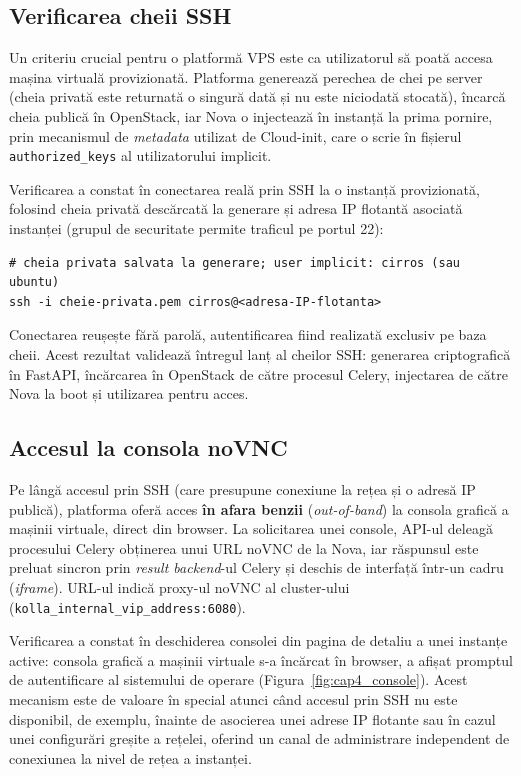 \subsection{Verificarea cheii SSH}
\label{subsec:cap4_ssh}

Un criteriu crucial pentru o platformă VPS este ca utilizatorul să poată accesa mașina virtuală provizionată. Platforma generează perechea de chei pe server (cheia privată este returnată o singură dată și nu este niciodată stocată), încarcă cheia publică în OpenStack, iar Nova o injectează în instanță la prima pornire, prin mecanismul de \textit{metadata} utilizat de Cloud-init, care o scrie în fișierul \texttt{authorized\_keys} al utilizatorului implicit.

Verificarea a constat în conectarea reală prin SSH la o instanță provizionată, folosind cheia privată descărcată la generare și adresa IP flotantă asociată instanței (grupul de securitate permite traficul pe portul 22):

\begin{lstlisting}[basicstyle=\ttfamily\footnotesize,breaklines=true,frame=single]
# cheia privata salvata la generare; user implicit: cirros (sau ubuntu)
ssh -i cheie-privata.pem cirros@<adresa-IP-flotanta>
\end{lstlisting}

\noindent Conectarea reușește fără parolă, autentificarea fiind realizată exclusiv pe baza cheii. Acest rezultat validează întregul lanț al cheilor SSH: generarea criptografică în FastAPI, încărcarea în OpenStack de către procesul Celery, injectarea de către Nova la boot și utilizarea pentru acces.

\subsection{Accesul la consola noVNC}
\label{subsec:cap4_console}

Pe lângă accesul prin SSH (care presupune conexiune la rețea și o adresă IP publică), platforma oferă acces \textbf{în afara benzii} (\textit{out-of-band}) la consola grafică a mașinii virtuale, direct din browser. La solicitarea unei console, API-ul deleagă procesului Celery obținerea unui URL noVNC de la Nova, iar răspunsul este preluat sincron prin \textit{result backend}-ul Celery și deschis de interfață într-un cadru (\textit{iframe}). URL-ul indică proxy-ul noVNC al cluster-ului (\texttt{kolla\_internal\_vip\_address:6080}).

Verificarea a constat în deschiderea consolei din pagina de detaliu a unei instanțe active: consola grafică a mașinii virtuale s-a încărcat în browser, a afișat promptul de autentificare al sistemului de operare (Figura~\ref{fig:cap4_console}). Acest mecanism este de valoare în special atunci când accesul prin SSH nu este disponibil, de exemplu, înainte de asocierea unei adrese IP flotante sau în cazul unei configurări greșite a rețelei, oferind un canal de administrare independent de conexiunea la nivel de rețea a instanței.

